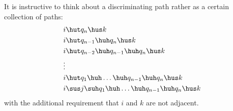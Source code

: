 \begin{Rem}\label{rem:discriminating_path}
  It is instructive to think about a discriminating path rather as a certain collection of paths:
  \begin{align*}
    &i \hut q_n \hus k \\
    &i \hut q_{n-1} \huh q_n \hus k \\
    &i \hut q_{n-2} \huh q_{n-1} \huh q_n \hus k \\
    &\vdots \\
    &i \hut q_1 \huh \dots \huh q_{n-1} \huh q_n \hus k  \\
    &i \sus j \suh q_1 \huh \dots \huh q_{n-1} \huh q_n \hus k
  \end{align*}
  with the additional requirement that $i$ and $k$ are not adjacent.
\end{Rem}

